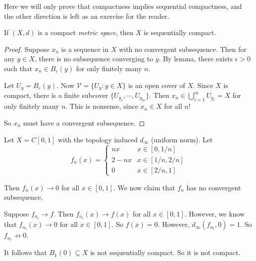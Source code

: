 \documentclass[a4paper]{article}
\begin{document}
Here we will only prove that compactness implies sequential compactness, and the other direction is left as an exercise for the reader.
\begin{thm}[]
  If $(X, d)$ is a compact \emph{metric space}, then $X$ is sequentially compact.
\end{thm}

\begin{proof}
  Suppose $x_n$ is a sequence in $X$ with no convergent subsequence. Then for any $y\in X$, there is no subsequence converging to $y$. By lemma, there exists $\epsilon > 0$ such that $x_n\in B_\varepsilon (y)$ for only finitely many $n$.

  Let $U_y = B_\varepsilon (y)$. Now $\mathcal{V} = \{U_y: y\in X\}$ is an open cover of $X$. Since $X$ is compact, there is a finite subcover $\{U_{y_1}, \cdots, U_{y_m}\}$. Then $x_n \in \bigcup_{i = 1}^m U_{y_i} = X$ for only finitely many $n$. This is nonsense, since $x_n \in X$ for all $n$!

  So $x_n$ must have a convergent subsequence.
\end{proof}

\begin{eg}
  Let $X = C[0, 1]$ with the topology induced $d_\infty$ (uniform norm). Let
  \[
    f_n(x) =
    \begin{cases}
      nx & x\in [0, 1/n]\\
      2 - nx & x\in [1/n, 2/n]\\
      0 & x \in [2/n, 1]
    \end{cases}
  \]
  \begin{center}
  \end{center}
  Then $f_n(x) \to 0$ for all $x\in [0, 1]$. We now claim that $f_n$ has no convergent subsequence.

  Suppose $f_{n_i} \to f$. Then $f_{n_i}(x) \to f(x)$ for all $x\in [0, 1]$. However, we know that $f_{n_i}(x) \to 0$ for all $x\in [0, 1]$. So $f(x) = 0$. However, $d_{\infty}(f_{n_i}, 0) = 1$. So $f_{n_i}\not \to 0$.

  It follows that $B_1(0)\subseteq X$ is not sequentially compact. So it is not compact.
\end{eg}
\end{document}
